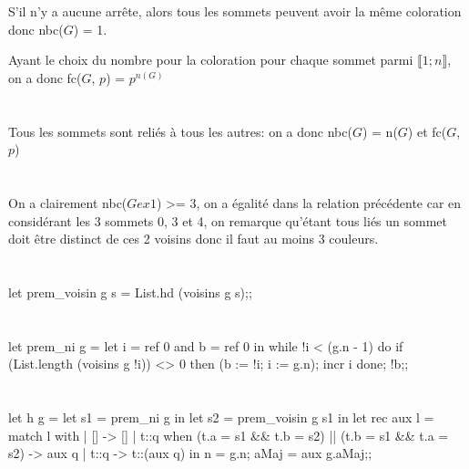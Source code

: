 \documentclass{article}
\begin{document}
			S'il n'y a aucune arrête, alors tous les sommets peuvent avoir la même coloration donc nbc($G$) = 1.
	
	Ayant le choix du nombre pour la coloration pour chaque sommet parmi $\llbracket 1; n \rrbracket$, on a donc fc($G$, $p$) = $p^{n(G)}$

		\section{}
		
			Tous les sommets sont reliés à tous les autres:
on a donc nbc($G$) = n($G$) et fc($G$, $p$) %

		\section{}
		
			On a clairement nbc($Gex1$) >= 3, on a égalité dans la relation précédente car en considérant les 3 sommets 0, 3 et 4, on remarque qu'étant tous liés un sommet doit être distinct de ces 2 voisins donc il faut au moins 3 couleurs.
			
			
		
		\section{}
		
			\begin{case}
let prem_voisin g s =
	List.hd (voisins g s);;
			\end{case}
			
		\section{}
		
			\begin{case}
let prem_ni g =
	let i = ref 0 and b = ref 0 in
	while !i < (g.n - 1) do
		if (List.length (voisins g !i)) <> 0 then (b := !i; i := g.n);
		incr i
	done;
	!b;;
			\end{case}
		
		\section{}
		
			\begin{case}
let h g =
	let s1 = prem_ni g in
	let s2 = prem_voisin g s1 in
	let rec aux l = match l with
	| [] -> []
	| t::q when (t.a = s1 && t.b = s2) || (t.b = s1 && t.a = s2) -> aux q
	| t::q -> t::(aux q)
	in {n = g.n; aMaj = aux g.aMaj};;
			\end{case}
			
\end{document}
